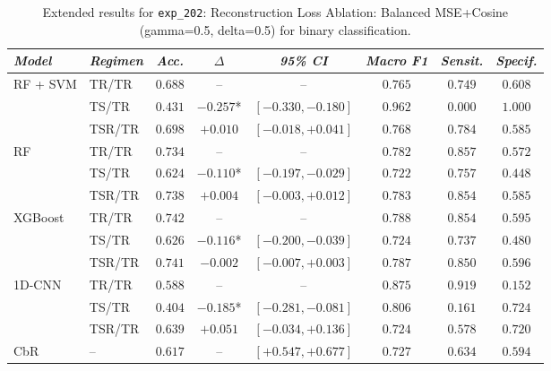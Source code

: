 \begin{table}[H]
\centering
\scriptsize
\caption{Extended results for \texttt{exp\_202}: Reconstruction Loss Ablation: Balanced MSE+Cosine (gamma=0.5, delta=0.5) for binary classification.}
\label{tab:appendix_exp_202}
\begin{tabular*}{\textwidth}{@{\extracolsep{\fill}}llcccccc}
\toprule
\emph{Model} & \emph{Regimen} & \emph{Acc.} & \emph{$\Delta$} & \emph{95\% CI} & \emph{Macro F1} & \emph{Sensit.} & \emph{Specif.}\\
\midrule
\multirow{3}{*}{RF + SVM} & TR/TR & $0.688$ & -- & -- & $0.765$ & $0.749$ & $0.608$\\
 & TS/TR & $0.431$ & $-0.257$* & $[-0.330, -0.180]$ & $0.962$ & $0.000$ & $1.000$\\
 & TSR/TR & $0.698$ & $+0.010$ & $[-0.018, +0.041]$ & $0.768$ & $0.784$ & $0.585$\\
\midrule
\multirow{3}{*}{RF} & TR/TR & $0.734$ & -- & -- & $0.782$ & $0.857$ & $0.572$\\
 & TS/TR & $0.624$ & $-0.110$* & $[-0.197, -0.029]$ & $0.722$ & $0.757$ & $0.448$\\
 & TSR/TR & $0.738$ & $+0.004$ & $[-0.003, +0.012]$ & $0.783$ & $0.854$ & $0.585$\\
\midrule
\multirow{3}{*}{XGBoost} & TR/TR & $0.742$ & -- & -- & $0.788$ & $0.854$ & $0.595$\\
 & TS/TR & $0.626$ & $-0.116$* & $[-0.200, -0.039]$ & $0.724$ & $0.737$ & $0.480$\\
 & TSR/TR & $0.741$ & $-0.002$ & $[-0.007, +0.003]$ & $0.787$ & $0.850$ & $0.596$\\
\midrule
\multirow{3}{*}{1D-CNN} & TR/TR & $0.588$ & -- & -- & $0.875$ & $0.919$ & $0.152$\\
 & TS/TR & $0.404$ & $-0.185$* & $[-0.281, -0.081]$ & $0.806$ & $0.161$ & $0.724$\\
 & TSR/TR & $0.639$ & $+0.051$ & $[-0.034, +0.136]$ & $0.724$ & $0.578$ & $0.720$\\
\midrule
CbR & -- & $0.617$ & -- & $[+0.547, +0.677]$ & $0.727$ & $0.634$ & $0.594$\\
\bottomrule
\end{tabular*}
\end{table}

